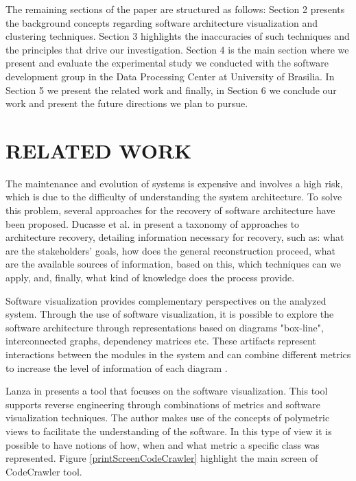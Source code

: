 \documentclass{sig-alternate-05-2015}
\begin{document}
The remaining sections of the paper are structured as follows: Section 2 presents the background concepts regarding software architecture visualization and clustering techniques. Section 3 highlights the inaccuracies of such techniques and the principles that drive our investigation. Section 4 is the main section where we present and evaluate the experimental study we conducted with the software development group in the Data Processing Center at University of Brasilia. In Section 5 we present the related work and finally, in Section 6 we conclude our work and present the future directions we plan to pursue.


\section{RELATED WORK}%
The maintenance and evolution of systems is expensive and involves a high risk, which is due to the difficulty of understanding the system architecture. To solve this problem, several approaches for the recovery of software architecture have been proposed. Ducasse et al. in \cite{ducasse_software_2009} present a taxonomy of approaches to architecture recovery, detailing information necessary for recovery, such as: what are the stakeholders’ goals, how does the general reconstruction proceed, what are the available sources of information, based on this, which techniques can we apply, and, finally, what kind of knowledge does the process provide.

Software visualization provides complementary perspectives on the analyzed system. Through the use of software visualization, it is possible to explore the software architecture through representations based on diagrams "box-line", interconnected graphs, dependency matrices etc. These artifacts represent interactions between the modules in the system and can combine different metrics to increase the level of information of each diagram \cite{ lungu_lanza_2007}.

Lanza in \cite {lanza_codecrawler-lessons_2003} presents a tool that focuses on the software visualization. This tool supports reverse engineering through combinations of metrics and software visualization techniques. The author makes use of the concepts of polymetric views to facilitate the understanding of the software. In this type of view it is possible to have notions of how, when and what metric a specific class was represented. Figure \ref{printScreenCodeCrawler} highlight the main screen of CodeCrawler tool.
\end{document}
